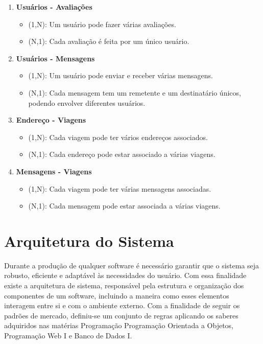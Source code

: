 \begin{enumerate}
	\item \textbf{Usuários - Avaliações}
	\begin{itemize}
		\item (1,N): Um usuário pode fazer várias avaliações.
		\item (N,1): Cada avaliação é feita por um único usuário.
	\end{itemize}
	
	\item \textbf{Usuários - Mensagens}
	\begin{itemize}
		\item (1,N): Um usuário pode enviar e receber várias mensagens.
		\item (N,1): Cada mensagem tem um remetente e um destinatário únicos, podendo envolver diferentes usuários.
	\end{itemize}
	
	\item \textbf{Endereço - Viagens}
	\begin{itemize}
		\item (1,N): Cada viagem pode ter vários endereços associados.
		\item (N,1): Cada endereço pode estar associado a várias viagens.
	\end{itemize}
	
	\item \textbf{Mensagens - Viagens}
	\begin{itemize}
		\item (1,N): Cada viagem pode ter várias mensagens associadas.
		\item (N,1): Cada mensagem pode estar associada a várias viagens.
	\end{itemize}
\end{enumerate}




\section{Arquitetura do Sistema}

Durante a produção de qualquer software é necessário garantir que o sistema seja robusto, eficiente e adaptável às necessidades do usuário. Com essa finalidade existe a arquitetura de sistema, responsável pela estrutura e organização dos componentes de um software, incluindo a maneira como esses elementos interagem entre si e com o ambiente externo. Com a finalidade de seguir os padrões de mercado, definiu-se um conjunto de regras aplicando os saberes adquiridos nas matérias Programação Programação Orientada a Objetos, Programação Web I e Banco de Dados I.

